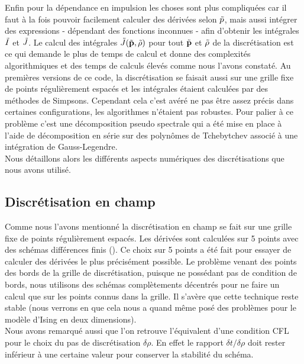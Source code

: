 \documentclass[10pt]{article}
\begin{document}
\begin{multicols}{2}
Enfin pour la dépendance en impulsion les choses sont plus compliquées car il faut à la fois pouvoir facilement calculer des dérivées selon $\tilde{p}$, mais aussi intégrer des expressions - dépendant des fonctions inconnues - afin d'obtenir les intégrales $\tilde{I}$ et $\tilde{J}$. Le calcul des intégrales $\tilde{J}(\tilde{{\bf p}}, \tilde{\rho})$ pour tout $\tilde{{\bf p}}$ et $\tilde{\rho}$ de la discrétisation est ce qui demande le plus de temps de calcul et donne des complexités algorithmiques et des temps de calculs élevés comme nous l'avons constaté. Au premières versions de ce code, la discrétisation se faisait aussi sur une grille fixe de points régulièrement espacés et les intégrales étaient calculées par des méthodes de Simpsons. Cependant cela c'est avéré ne pas être assez précis dans certaines configurations, les algorithmes n'étaient pas robustes. Pour palier à ce problème c'est une décomposition pseudo spectrale qui a été mise en place à l'aide de décomposition en série sur des polynômes de Tchebytchev associé à une intégration de Gauss-Legendre. \\

Nous détaillons alors les différents aspects numériques des discrétisations que nous avons utilisé.




\subsection{Discrétisation en champ}

Comme nous l'avons mentionné la discrétisation en champ se fait sur une grille fixe de points régulièrement espacés. Les dérivées sont calculées sur 5 points avec des schémas différences finis (). Ce choix sur 5 points  a été fait pour essayer de calculer des dérivées le plus précisément possible. Le problème venant des points des bords de la grille de discrétisation, puisque ne possédant pas de condition de bords, nous utilisons des schémas complètements décentrés pour ne faire un calcul que sur les points connus dans la grille. Il s'avère que cette technique reste stable (nous verrons en  que cela nous a quand même posé des problèmes pour le modèle d'Ising en deux dimensions). \\

Nous avons remarqué aussi que l'on retrouve l'équivalent d'une condition CFL pour le choix du pas de discrétisation $\delta \rho$. En effet le rapport $\delta t / \delta\rho$ doit rester inférieur à une certaine valeur pour conserver la stabilité du schéma.\\


\end{multicols}
\end{document}
